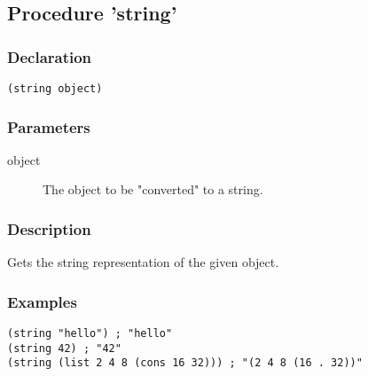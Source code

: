 \subsection{Procedure 'string'}
\label{builtins/string}

\subsubsection*{Declaration}
\begin{lstlisting}
(string object)
\end{lstlisting}

\subsubsection*{Parameters}
\begin{description}
	\item[object] The object to be "converted" to a string.
\end{description}

\subsubsection*{Description}
Gets the string representation of the given object.

\subsubsection*{Examples}
\begin{lstlisting}
(string "hello") ; "hello"
(string 42) ; "42"
(string (list 2 4 8 (cons 16 32))) ; "(2 4 8 (16 . 32))"
\end{lstlisting}
